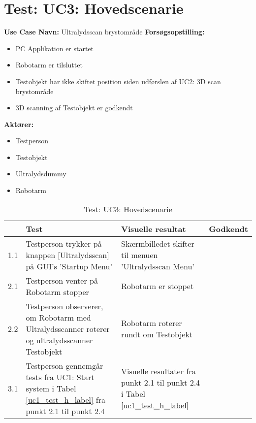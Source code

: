 
\section{Test: UC3: Hovedscenarie}
\textbf{Use Case Navn:} Ultralydsscan brystområde \newline
\textbf{Forsøgsopstilling:}
\begin{itemize}
\item PC Applikation er startet
\item Robotarm er tilsluttet
\item Testobjekt har ikke skiftet position siden udførslen af UC2: 3D scan brystområde
\item 3D scanning af Testobjekt er godkendt
\end{itemize}  
\textbf{Aktører:}
\begin{itemize}
\item Testperson
\item Testobjekt
\item Ultralydsdummy 
\item Robotarm
\end{itemize}  

\begin{table}[htb]
\begin{tabularx}{\textwidth}{|p{0.5cm}|X|X|p{2cm}|}
\hline
\textbf{} & \textbf{Test} & \textbf{Visuelle resultat} &\textbf{Godkendt} \\\hline
1.1 & Testperson trykker på knappen [Ultralydsscan] på GUI's 'Startup Menu' & Skærmbilledet skifter til menuen 'Ultralydsscan Menu' & \\\hline
2.1 & Testperson venter på Robotarm stopper & Robotarm er stoppet & \\\hline
2.2 & Testperson observerer, om Robotarm med Ultralydsscanner roterer og ultralydsscanner Testobjekt & Robotarm roterer rundt om Testobjekt & \\\hline
3.1 & Testperson gennemgår tests fra UC1: Start system i Tabel \ref{uc1_test_h_label} fra punkt 2.1 til punkt 2.4  & Visuelle resultater fra punkt 2.1 til punkt 2.4 i Tabel \ref{uc1_test_h_label} & \\ \hline
\end{tabularx}
    \caption{Test: UC3: Hovedscenarie} 
    \label{uc3_test_h_label}  
\end{table}
\newpage



